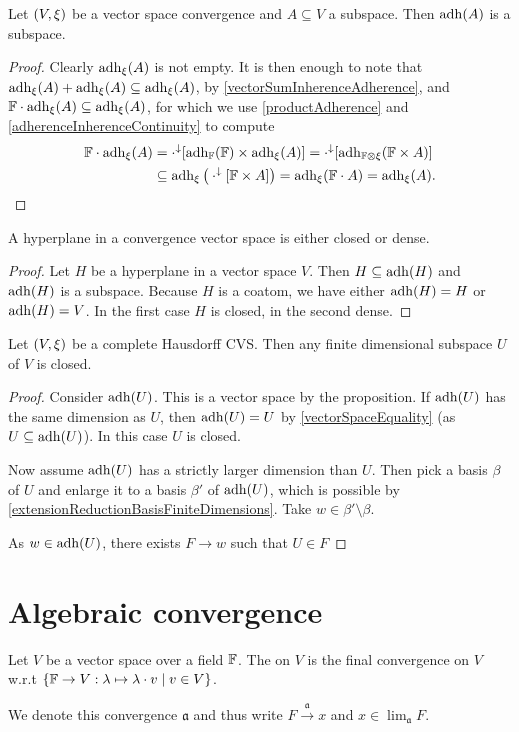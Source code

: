 \begin{proposition}
Let $\left( V,\xi \right)$ be a vector space convergence and $A\subseteq V$ a subspace. Then $\operatorname{adh}(A)$ is a subspace.
\end{proposition}
\begin{proof}
Clearly $\operatorname{adh}_\xi(A)$ is not empty. It is then enough to note that $\operatorname{adh}_\xi(A)+\operatorname{adh}_\xi(A)\subseteq \operatorname{adh}_\xi(A)$, by \ref{vectorSumInherenceAdherence}, and $\mathbb{F}\cdot \operatorname{adh}_\xi(A) \subseteq \operatorname{adh}_\xi(A)$, for which we use \ref{productAdherence} and \ref{adherenceInherenceContinuity} to compute
\begin{align*}
\mathbb{F}\cdot \operatorname{adh}_\xi(A) &= \cdot^\downarrow[\operatorname{adh}_{\mathbb{F}}(\mathbb{F})\times \operatorname{adh}_\xi(A)] = \cdot^\downarrow[\operatorname{adh}_{\mathbb{F}\otimes \xi}(\mathbb{F}\times A)] \\
&\subseteq \operatorname{adh}_{\xi}\big(\cdot^\downarrow[\mathbb{F}\times A]\big) = \operatorname{adh}_{\xi}(\mathbb{F}\cdot A) = \operatorname{adh}_\xi(A).
\end{align*}
\end{proof}
\begin{corollary} \label{hyperplaneClosedDense}
A hyperplane in a convergence vector space is either closed or dense.
\end{corollary}
\begin{proof}
Let $H$ be a hyperplane in a vector space $V$. Then $H \subseteq \operatorname{adh}(H)$ and $\operatorname{adh}(H)$ is a subspace. Because $H$ is a coatom, we have either $\operatorname{adh}(H) = H$ or $\operatorname{adh}(H) = V$. In the first case $H$ is closed, in the second dense.
\end{proof}
\begin{corollary}
Let $\left( V,\xi \right)$ be a complete Hausdorff CVS. Then any finite dimensional subspace $U$ of $V$ is closed.
\end{corollary}
\begin{proof}
Consider $\operatorname{adh}(U)$. This is a vector space by the proposition. If $\operatorname{adh}(U)$ has the same dimension as $U$, then $\operatorname{adh}(U) = U$ by \ref{vectorSpaceEquality} (as $U \subseteq \operatorname{adh}(U)$). In this case $U$ is closed.

Now assume $\operatorname{adh}(U)$ has a strictly larger dimension than $U$. Then pick a basis $\beta$ of $U$ and enlarge it to a basis $\beta'$ of $\operatorname{adh}(U)$, which is possible by \ref{extensionReductionBasisFiniteDimensions}. Take $w\in \beta'\setminus \beta$.

As $w\in\operatorname{adh}(U)$, there exists $F\to w$ such that $U\in F$
\end{proof}


\section{Algebraic convergence}
\begin{definition}
Let $V$ be a vector space over a field $\mathbb{F}$. The  on $V$ is the final convergence on $V$ w.r.t $\left\{ \mathbb{F} \to V: \lambda\mapsto \lambda \cdot v \;\middle|\; v\in V \right\}$.

We denote this convergence $\mathfrak{a}$ and thus write $F \overset{\mathfrak{a}}{\longrightarrow} x$ and $x\in \lim_\mathfrak{a} F$.
\end{definition}

